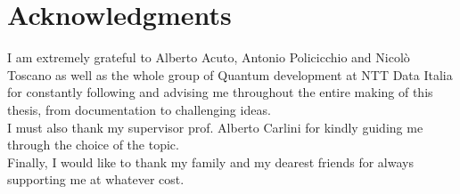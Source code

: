 \chapter*{Acknowledgments} \label{Acknowledgments}

I am extremely grateful to Alberto Acuto, Antonio Policicchio and Nicolò Toscano as well as the whole group of Quantum development at NTT Data Italia for constantly following and advising me throughout the entire making of this thesis, from documentation to challenging ideas. \\
I must also thank my supervisor prof. Alberto Carlini for kindly guiding me through the choice of the topic. \\
Finally, I would like to thank my family and my dearest friends for always supporting me at whatever cost.